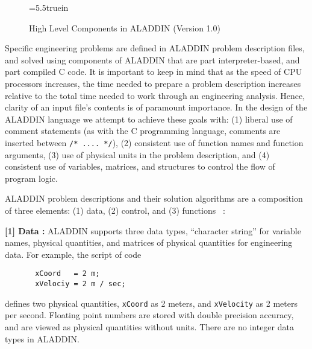 \begin{figure}[th]
\epsfxsize=5.5truein
\centerline{}
\caption{High Level Components in ALADDIN (Version 1.0)}
\label{fig: aladdin-development}
\end{figure}

\vspace{0.15 in}
\noindent\hspace{0.5 in}
Specific engineering problems are defined in ALADDIN problem
description files, and solved using
components of ALADDIN that are part interpreter-based, and part compiled C code.
It is important to keep in mind that as the speed of CPU processors increases,
the time needed to prepare a problem description increases
relative to the total time needed to work through an engineering analysis.
Hence, clarity of an input file's contents is of paramount importance.
In the design of the ALADDIN language we attempt to achieve these goals with:
(1) liberal use of comment statements (as with the C programming language,
comments are inserted between {\tt /* .... */}),
(2) consistent use of function names and function arguments,
(3) use of physical units in the problem description, and
(4) consistent use of variables, matrices,
and structures to control the flow of program logic.

\vspace{0.15 in}
\noindent\hspace{0.5 in}
ALADDIN problem descriptions and their solution algorithms
are a composition of three elements:
(1) data, (2) control, and (3) functions ~\cite{salter76}:

\vspace{0.15 in}\noindent
{\bf [1] Data :} 
ALADDIN supports three data types, ``character string'' for variable names,
physical quantities, and matrices of physical quantities for engineering data.
For example, the script of code

\begin{footnotesize} 
\begin{verbatim}
       xCoord   = 2 m;
       xVelociy = 2 m / sec;
\end{verbatim}
\end{footnotesize} 

\vspace{0.15 in}\noindent
defines two physical quantities, {\tt xCoord} as 2 meters,
and {\tt xVelocity} as 2 meters per second.
Floating point numbers are stored with double precision accuracy, and are
viewed as physical quantities without units.
There are no integer data types in ALADDIN.

